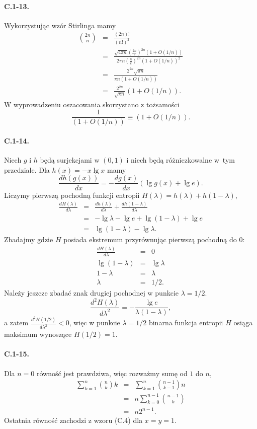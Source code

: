 \paragraph{C.1-13.}
Wykorzystując wzór Stirlinga mamy
\begin{eqnarray*}
	\binom{2n}{n} &=& \frac{(2n)!}{(n!)^2} \\
	&=& \frac{\sqrt{4\pi n}\left(\frac{2n}{e}\right)^{2n}\left(1+O(1/n)\right)}{2\pi n\left(\frac{n}{e}\right)^{2n}\left(1+O(1/n)\right)^2} \\
	&=& \frac{2^{2n}\sqrt{\pi n}}{\pi n\left(1+O(1/n)\right)} \\
	&=& \frac{2^{2n}}{\sqrt{\pi n}}\left(1+O(1/n)\right).
\end{eqnarray*}
W wyprowadzeniu oszacowania skorzystano z tożsamości
\[
	\frac{1}{\left(1+O(1/n)\right)} \equiv \left(1+O(1/n)\right).
\]

\paragraph{C.1-14.}
Niech $g$ i $h$ będą surjekcjami w $(0,1)$ i niech będą różniczkowalne w~tym przedziale. Dla $h(x) = -x\lg x$ mamy
\[
	\frac{dh(g(x))}{dx} = -\frac{dg(x)}{dx}\left(\lg g(x)+\lg e\right).
\]
Liczymy pierwszą pochodną funkcji entropii $H(\lambda)=h(\lambda)+h(1-\lambda)$,
\begin{eqnarray*}
	\frac{dH(\lambda)}{d\lambda} &=& \frac{dh(\lambda)}{d\lambda}+\frac{dh(1-\lambda)}{d\lambda} \\
	&=& -\lg\lambda-\lg e+\lg(1-\lambda)+\lg e \\
	&=& \lg\left(1-\lambda\right)-\lg\lambda.
\end{eqnarray*}
Zbadajmy gdzie $H$ posiada ekstremum przyrównując pierwszą pochodną do $0$:
\begin{eqnarray*}
	\frac{dH(\lambda)}{d\lambda} &=& 0 \\
	\lg\left(1-\lambda\right) &=& \lg\lambda \\
	1-\lambda &=& \lambda \\
	\lambda &=& 1/2.
\end{eqnarray*}
Należy jeszcze zbadać znak drugiej pochodnej w punkcie $\lambda=1/2$.
\[
	\frac{d^2H(\lambda)}{d\lambda^2} = -\frac{\lg e}{\lambda(1-\lambda)},
\]
a zatem $\frac{d^2H(1/2)}{d\lambda^2}<0$, więc w punkcie $\lambda=1/2$ binarna funkcja entropii $H$ osiąga maksimum wynoszące $H(1/2)=1$.

\paragraph{C.1-15.}
Dla $n=0$ równość jest prawdziwa, więc rozważmy sumę od $1$ do $n$,
\begin{eqnarray*}
	\sum_{k=1}^n\binom{n}{k}k &=& \sum_{k=1}^n\binom{n-1}{k-1}n \\
	&=& n\sum_{k=0}^{n-1}\binom{n-1}{k} \\
	&=& n2^{n-1}.
\end{eqnarray*}
Ostatnia równość zachodzi z wzoru (C.4) dla $x=y=1$.

